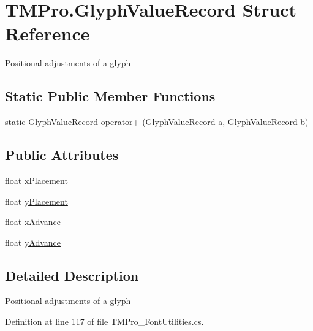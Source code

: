 \hypertarget{struct_t_m_pro_1_1_glyph_value_record}{}\section{T\+M\+Pro.\+Glyph\+Value\+Record Struct Reference}
\label{struct_t_m_pro_1_1_glyph_value_record}


Positional adjustments of a glyph  


\subsection*{Static Public Member Functions}
\begin{DoxyCompactItemize}
\item 
static \mbox{\hyperlink{struct_t_m_pro_1_1_glyph_value_record}{Glyph\+Value\+Record}} \mbox{\hyperlink{struct_t_m_pro_1_1_glyph_value_record_ab9701cc6920a990edcbc89e0b81e4dbe}{operator+}} (\mbox{\hyperlink{struct_t_m_pro_1_1_glyph_value_record}{Glyph\+Value\+Record}} a, \mbox{\hyperlink{struct_t_m_pro_1_1_glyph_value_record}{Glyph\+Value\+Record}} b)
\end{DoxyCompactItemize}
\subsection*{Public Attributes}
\begin{DoxyCompactItemize}
\item 
float \mbox{\hyperlink{struct_t_m_pro_1_1_glyph_value_record_afb4534930ae23f35c3f5d788a41d3b0d}{x\+Placement}}
\item 
float \mbox{\hyperlink{struct_t_m_pro_1_1_glyph_value_record_aab66b2d9351d8e799ea4e8250efc3366}{y\+Placement}}
\item 
float \mbox{\hyperlink{struct_t_m_pro_1_1_glyph_value_record_abfd29f327c97832feec2d9b3e2bb7abc}{x\+Advance}}
\item 
float \mbox{\hyperlink{struct_t_m_pro_1_1_glyph_value_record_ae03fad907bb5a768820e58c02cbc28f6}{y\+Advance}}
\end{DoxyCompactItemize}


\subsection{Detailed Description}
Positional adjustments of a glyph 



Definition at line 117 of file T\+M\+Pro\+\_\+\+Font\+Utilities.\+cs.



